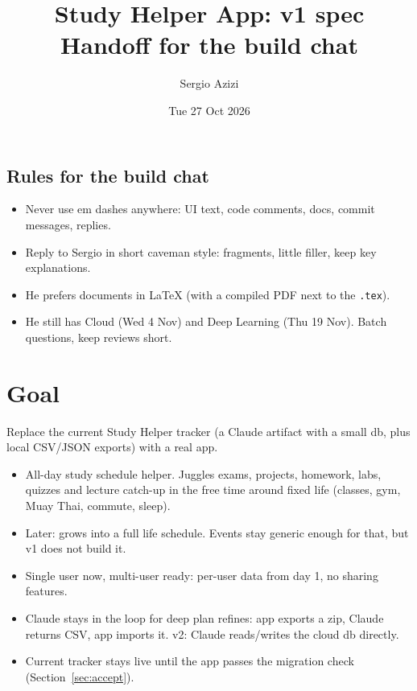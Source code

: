 \documentclass[11pt,a4paper]{article}
\title{\color{accent}\textbf{Study Helper App: v1 spec}\\[4pt]\large Handoff for the build chat}
\author{Sergio Azizi}
\date{Tue 27 Oct 2026}
\newcommand{\code}[1]{\texttt{\small #1}}
\begin{document}
\maketitle
\thispagestyle{fancy}

\noindent{}

\subsection*{Rules for the build chat}
\begin{itemize}
  \item Never use em dashes anywhere: UI text, code comments, docs, commit messages, replies.
  \item Reply to Sergio in short caveman style: fragments, little filler, keep key explanations.
  \item He prefers documents in \LaTeX{} (with a compiled PDF next to the \code{.tex}).
  \item He still has Cloud (Wed 4 Nov) and Deep Learning (Thu 19 Nov). Batch questions, keep reviews short.
\end{itemize}

\tableofcontents

\section{Goal}

Replace the current Study Helper tracker (a Claude artifact with a small db, plus local CSV/JSON exports) with a real app.

\begin{itemize}
  \item All-day study schedule helper. Juggles exams, projects, homework, labs, quizzes and lecture catch-up in the free time around fixed life (classes, gym, Muay Thai, commute, sleep).
  \item Later: grows into a full life schedule. Events stay generic enough for that, but v1 does not build it.
  \item Single user now, multi-user ready: per-user data from day 1, no sharing features.
  \item Claude stays in the loop for deep plan refines: app exports a zip, Claude returns CSV, app imports it. v2: Claude reads/writes the cloud db directly.
  \item Current tracker stays live until the app passes the migration check (Section~\ref{sec:accept}).
\end{itemize}
\end{document}
